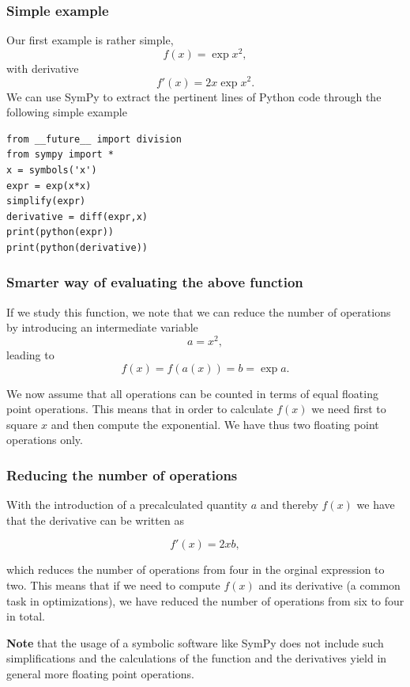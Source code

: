 \documentclass{beamer}
\begin{document}
\begin{frame}
\frametitle{Simple example}

Our first example is rather simple,
\[
f(x) =\exp{x^2},
\]
with derivative
\[
f'(x) =2x\exp{x^2}.
\]
We can use SymPy to extract the pertinent lines of Python code through the following simple example









\begin{verbatim}
from __future__ import division
from sympy import *
x = symbols('x')
expr = exp(x*x)
simplify(expr)
derivative = diff(expr,x)
print(python(expr))
print(python(derivative))

\end{verbatim}
\end{frame}

\begin{frame}
\frametitle{Smarter way of evaluating the above function}

If we study this function, we note that we can reduce the number of operations by introducing an intermediate variable
\[
a = x^2,
\]
leading to 
\[
f(x) = f(a(x)) = b= \exp{a}.
\]

We now assume that all operations can be counted in terms of equal
floating point operations. This means that in order to calculate
$f(x)$ we need first to square $x$ and then compute the exponential. We
have thus two floating point operations only.
\end{frame}

\begin{frame}
\frametitle{Reducing the number of operations}

With the introduction of a precalculated quantity $a$ and thereby $f(x)$ we have that the derivative can be written as

\[
f'(x) = 2xb,
\]

which reduces the number of operations from four in the orginal
expression to two. This means that if we need to compute $f(x)$ and
its derivative (a common task in optimizations), we have reduced the
number of operations from six to four in total.

\textbf{Note} that the usage of a symbolic software like SymPy does not
include such simplifications and the calculations of the function and
the derivatives yield in general more floating point operations.
\end{frame}
\end{document}
